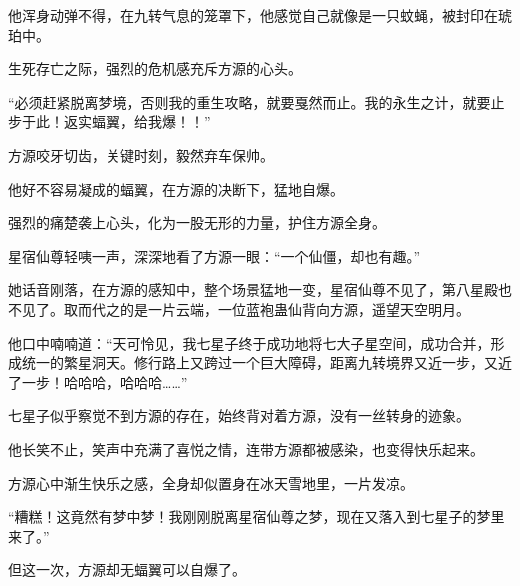 \begin{this_body}
他浑身动弹不得，在九转气息的笼罩下，他感觉自己就像是一只蚊蝇，被封印在琥珀中。

生死存亡之际，强烈的危机感充斥方源的心头。

“必须赶紧脱离梦境，否则我的重生攻略，就要戛然而止。我的永生之计，就要止步于此！返实蝠翼，给我爆！！”

方源咬牙切齿，关键时刻，毅然弃车保帅。

他好不容易凝成的蝠翼，在方源的决断下，猛地自爆。

强烈的痛楚袭上心头，化为一股无形的力量，护住方源全身。

星宿仙尊轻咦一声，深深地看了方源一眼：“一个仙僵，却也有趣。”

她话音刚落，在方源的感知中，整个场景猛地一变，星宿仙尊不见了，第八星殿也不见了。取而代之的是一片云端，一位蓝袍蛊仙背向方源，遥望天空明月。

他口中喃喃道：“天可怜见，我七星子终于成功地将七大子星空间，成功合并，形成统一的繁星洞天。修行路上又跨过一个巨大障碍，距离九转境界又近一步，又近了一步！哈哈哈，哈哈哈……”

七星子似乎察觉不到方源的存在，始终背对着方源，没有一丝转身的迹象。

他长笑不止，笑声中充满了喜悦之情，连带方源都被感染，也变得快乐起来。

方源心中渐生快乐之感，全身却似置身在冰天雪地里，一片发凉。

“糟糕！这竟然有梦中梦！我刚刚脱离星宿仙尊之梦，现在又落入到七星子的梦里来了。”

但这一次，方源却无蝠翼可以自爆了。

\end{this_body}


